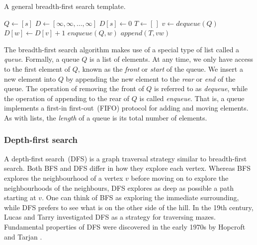 \begin{algorithm}[!ht]
    \caption{A general breadth-first search template.}
    \label{alg:graph_algorithms:breadth_first_search_template}
    \begin{algorithmic}[1]
	\State $Q \leftarrow [s]$
	\State $D \leftarrow [\infty, \infty, \dots, \infty]$
	\State $D[s] \leftarrow 0$	
	\State $T \leftarrow [\,]$
		\State $v \leftarrow dequeue(Q)$
				\State $D[w] \leftarrow D[v] + 1$
				\State $enqueue(Q, w)$
				\State $append(T, vw)$
			\EndIf
		\EndFor
	\EndWhile	
    \end{algorithmic}
\end{algorithm}


The breadth-first search algorithm makes use of a special type of list called a \emph{queue}. 
Formally, a queue $Q$ is a list of elements. 
At any time, we only have access to the first element of $Q$, known as the \emph{front} or \emph{start} of the queue. We insert
a new element into $Q$ by appending the new element to the \emph{rear} or \emph{end} of the queue. 
The operation of removing the front of $Q$ is referred to as \emph{dequeue}, while the operation of appending to the rear of $Q$ is called \emph{enqueue}. 
That is, a queue implements a first-in first-out~(FIFO) protocol for adding and moving elements. 
As with lists, the \emph{length} of a queue is its total number of elements.

\subsubsection{Depth-first search}


A depth-first search~(DFS) is a graph traversal strategy similar to
breadth-first search. Both BFS and DFS differ in how they explore each
vertex. Whereas BFS explores the neighbourhood of a vertex $v$ before
moving on to explore the neighbourhoods of the neighbours, DFS explores
as deep as possible a path starting at $v$. One can think of BFS as
exploring the immediate surrounding, while DFS prefers to see what is
on the other side of the hill. In the 19th century,
Lucas and Tarry investigated DFS as a strategy for traversing mazes. 
Fundamental properties of DFS were discovered in the early 1970s by Hopcroft and Tarjan \cite{schrijver2012history}.


